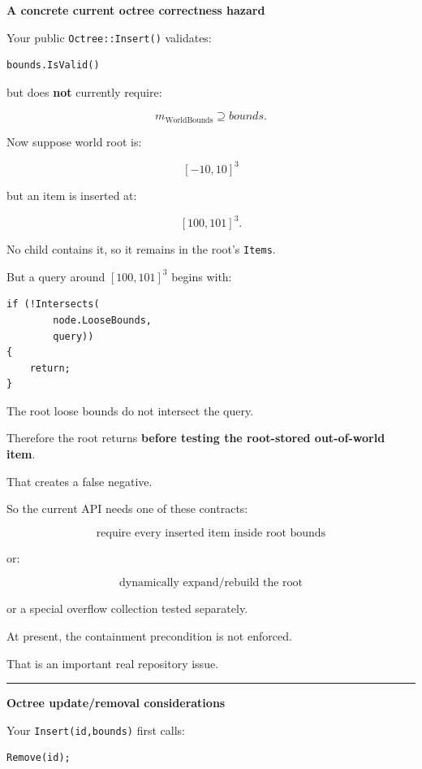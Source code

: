 \textbf{A concrete current octree correctness hazard}

Your public \texttt{Octree::Insert()} validates:

\begin{verbatim}
bounds.IsValid()
\end{verbatim}

but does \textbf{not} currently require:

\[
m_{\text{WorldBounds}}
\supseteq
bounds.
\]

Now suppose world root is:

\[
[-10,10]^3
\]

but an item is inserted at:

\[
[100,101]^3.
\]

No child contains it, so it remains in the root's \texttt{Items}.

But a query around \([100,101]^3\) begins with:

\begin{verbatim}
if (!Intersects(
        node.LooseBounds,
        query))
{
    return;
}
\end{verbatim}

The root loose bounds do not intersect the query.

Therefore the root returns \textbf{before testing the root-stored out-of-world item}.

That creates a false negative.

So the current API needs one of these contracts:

\[
\boxed{
\text{require every inserted item inside root bounds}
}
\]

or:

\[
\boxed{
\text{dynamically expand/rebuild the root}
}
\]

or a special overflow collection tested separately.

At present, the containment precondition is not enforced.

That is an important real repository issue.

\begin{center}\rule{0.5\linewidth}{0.5pt}\end{center}

\textbf{Octree update/removal considerations}

Your \texttt{Insert(id,bounds)} first calls:

\begin{verbatim}
Remove(id);
\end{verbatim}

